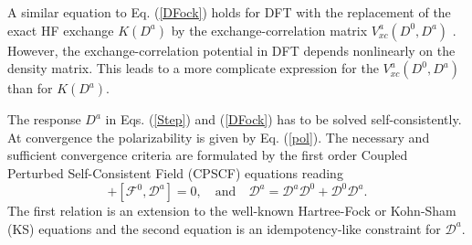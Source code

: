 \documentclass[twocolumn,showpacs,preprintnumbers,amsmath,amssymb]{revtex4}
\begin{document}

 A similar equation to Eq. (\ref{DFock}) 
 holds for DFT with the replacement of the exact HF
 exchange $K(D^a)$ by the exchange-correlation matrix 
 $V_{xc}^a(D^0,D^a)$ \cite{Lee_1994}. However,
 the exchange-correlation potential in DFT
 depends nonlinearly  on the density matrix. This leads
 to a more complicate expression for the
 $V_{xc}^a(D^0,D^a)$ than for $K(D^a)$.

 The response $D^a$ in Eqs. (\ref{Step}) and (\ref{DFock}) has
 to be solved self-consistently.
 At convergence the polarizability
 is given by Eq. (\ref{pol}). The necessary and
 sufficient convergence criteria are formulated by the first 
 order Coupled Perturbed Self-Consistent Field 
 (CPSCF) equations \cite{Furche_2001} reading
 \begin{equation}
   [\mathcal{F}^{a},\mathcal{D}^{0}]+
	       [\mathcal{F}^{0},\mathcal{D}^{a}]=0,\quad\textrm{and}\quad
   \mathcal{D}^{a}=\mathcal{D}^{a} \mathcal{D}^{0}
                     +\mathcal{D}^{0} \mathcal{D}^{a}.
 \end{equation}
 The first relation is an extension to the
 well-known Hartree-Fock or Kohn-Sham (KS) equations
 and the second equation is an idempotency-like
 constraint for $\mathcal{D}^a$.
\end{document}
